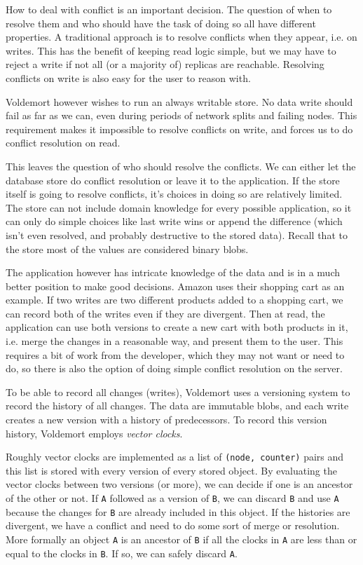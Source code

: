 How to deal with conflict is an important decision.
The question of when to resolve them and who should have the task of doing so all have different properties.
A traditional approach is to resolve conflicts when they appear, i.e. on writes. 
This has the benefit of keeping read logic simple, but we may have to reject a write if not all (or a majority of) replicas are reachable. Resolving conflicts on write is also easy for the user to reason with.

Voldemort however wishes to run an always writable store. No data write should fail as far as we can, even during periods of network splits and failing nodes.
This requirement makes it impossible to resolve conflicts on write, and forces us to do conflict resolution on read.

This leaves the question of who should resolve the conflicts. We can either let the database store do conflict resolution or leave it to the application.
If the store itself is going to resolve conflicts, it's choices in doing so are relatively limited.
The store can not include domain knowledge for every possible application, so it can only do simple choices like last write wins or append the difference (which isn't even resolved, and probably destructive to the stored data). Recall that to the store most of the values are considered binary blobs.

The application however has intricate knowledge of the data and is in a much better position to make good decisions. 
Amazon\cite{dynamo} uses their shopping cart as an example. If two writes are two different products added to a shopping cart, we can record both of the writes even if they are divergent.
Then at read, the application can use both versions to create a new cart with both products in it, i.e. merge the changes in a reasonable way, and present them to the user.
This requires a bit of work from the developer, which they may not want or need to do, so there is also the option of doing simple conflict resolution on the server.

To be able to record all changes (writes), Voldemort uses a versioning system to record the history of all changes. The data are immutable blobs, and each write creates a new version with a history of predecessors.
To record this version history, Voldemort employs \emph{vector clocks}.

Roughly vector clocks are implemented as a list of \texttt{(node, counter)} pairs and this list is stored with every version of every stored object.
By evaluating the vector clocks between two versions (or more), we can decide if one is an ancestor of the other or not. If \texttt{A} followed as a version of \texttt{B}, we can discard \texttt{B} and use \texttt{A} because the changes for \texttt{B} are already included in this object. 
If the histories are divergent, we have a conflict and need to do some sort of merge or resolution. More formally an object \texttt{A} is an ancestor of \texttt{B} if all the clocks in \texttt{A} are less than or equal to the clocks in \texttt{B}. 
If so, we can safely discard \texttt{A}.

